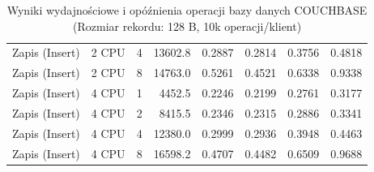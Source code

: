 \begin{table}[ht]
{\begin{tabular}{llcrrrrr}
Zapis (Insert) & 2 CPU & 4 & 13602.8 & 0.2887 & 0.2814 & 0.3756 & 0.4818 \\
Zapis (Insert) & 2 CPU & 8 & 14763.0 & 0.5261 & 0.4521 & 0.6338 & 0.9338 \\
Zapis (Insert) & 4 CPU & 1 & 4452.5 & 0.2246 & 0.2199 & 0.2761 & 0.3177 \\
Zapis (Insert) & 4 CPU & 2 & 8415.5 & 0.2346 & 0.2315 & 0.2886 & 0.3341 \\
Zapis (Insert) & 4 CPU & 4 & 12380.0 & 0.2999 & 0.2936 & 0.3948 & 0.4463 \\
Zapis (Insert) & 4 CPU & 8 & 16598.2 & 0.4707 & 0.4482 & 0.6509 & 0.9688 \\
\bottomrule
\end{tabular}%
}
\caption{Wyniki wydajnościowe i opóźnienia operacji bazy danych COUCHBASE (Rozmiar rekordu: 128 B, 10k operacji/klient)}
\label{tab:latency_couchbase_small_10000}
\end{table}
